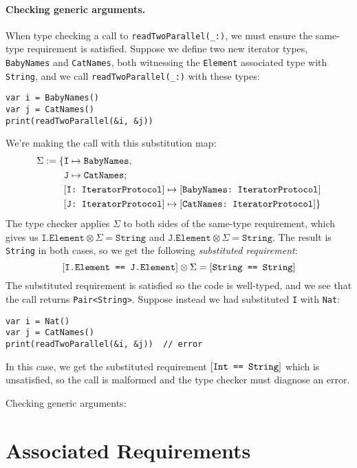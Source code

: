 \documentclass[../generics]{subfiles}
\begin{document}
\paragraph{Checking generic arguments.}
When type checking a call to \verb|readTwoParallel(_:)|, we must ensure the same-type requirement is satisfied. Suppose we define two new iterator types, \texttt{BabyNames} and \texttt{CatNames}, both witnessing the \texttt{Element} associated type with \texttt{String}, and we call \verb|readTwoParallel(_:)| with these types:
\begin{Verbatim}
var i = BabyNames()
var j = CatNames()
print(readTwoParallel(&i, &j))
\end{Verbatim}
We're making the call with this substitution map:
\begin{align*}
\Sigma := \{&\texttt{I} \mapsto \texttt{BabyNames},\\
&\texttt{J} \mapsto \texttt{CatNames};\,\\
&[\texttt{I:~IteratorProtocol}] \mapsto [\texttt{BabyNames:~IteratorProtocol}]\\
&[\texttt{J:~IteratorProtocol}] \mapsto [\texttt{CatNames:~IteratorProtocol}]\}
\end{align*}
The type checker applies $\Sigma$ to both sides of the same-type requirement, which gives us $\texttt{I.Element}\otimes\Sigma=\texttt{String}$ and $\texttt{J.Element}\otimes\Sigma=\texttt{String}$. The result is \texttt{String} in both cases, so we get the following \emph{substituted requirement}:
\[[\texttt{I.Element == J.Element}]\otimes\Sigma=[\texttt{String == String}]\]
The substituted requirement is satisfied so the code is well-typed, and we see that the call returns \texttt{Pair<String>}. Suppose instead we had substituted \texttt{I} with \texttt{Nat}:
\begin{Verbatim}
var i = Nat()
var j = CatNames()
print(readTwoParallel(&i, &j))  // error
\end{Verbatim}
In this case, we get the substituted requirement $[\texttt{Int == String}]$ which is unsatisfied, so the call is malformed and the type checker must diagnose an error.

\begin{MoreDetails}
\item Checking generic arguments: 
\end{MoreDetails}

\section{Associated Requirements}
\end{document}
